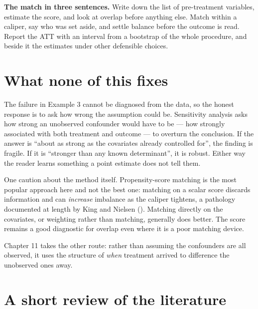 \documentclass[
  letterpaper,
  10pt,
  twoside,
  openright,
  numbers=noenddot,
  chapterprefix=true]{scrbook}
\begin{document}
\textbf{The match in three sentences.} Write down the list of
pre-treatment variables, estimate the score, and look at overlap before
anything else. Match within a caliper, say who was set aside, and settle
balance before the outcome is read. Report the ATT with an interval from
a bootstrap of the whole procedure, and beside it the estimates under
other defensible choices.

\section{What none of this fixes}\label{what-none-of-this-fixes}

The failure in Example 3 cannot be diagnosed from the data, so the
honest response is to ask how wrong the assumption could be. Sensitivity
analysis asks how strong an unobserved confounder would have to be ---
how strongly associated with both treatment and outcome --- to overturn
the conclusion. If the answer is ``about as strong as the covariates
already controlled for'', the finding is fragile. If it is ``stronger
than any known determinant'', it is robust. Either way the reader learns
something a point estimate does not tell them.

One caution about the method itself. Propensity-score matching is the
most popular approach here and not the best one: matching on a scalar
score discards information and can \emph{increase} imbalance as the
caliper tightens, a pathology documented at length by King and Nielsen
(). Matching directly on the covariates, or
weighting rather than matching, generally does better. The score remains
a good diagnostic for overlap even where it is a poor matching device.

Chapter 11 takes the other route: rather than assuming the confounders
are all observed, it uses the structure of \emph{when} treatment arrived
to difference the unobserved ones away.

\section{A short review of the
literature}\label{a-short-review-of-the-literature-8}
\end{document}
